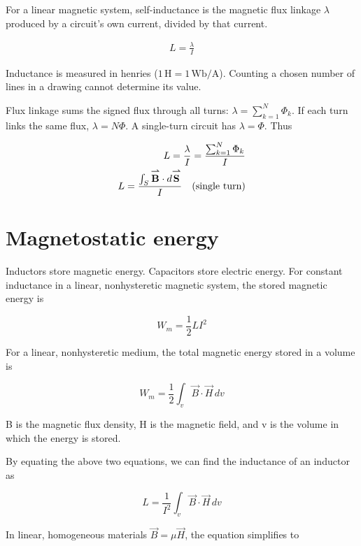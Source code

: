 \documentclass{ximera}
\begin{document}
For a linear magnetic system, self-inductance is the magnetic flux linkage $\lambda$ produced by a circuit's own current, divided by that current.
 
 \begin{eqnarray}
 L=\frac{\lambda}{I}
 \end{eqnarray}
 
Inductance is measured in henries ($1\,\mathrm{H}=1\,\mathrm{Wb}/\mathrm{A}$). Counting a chosen number of lines in a drawing cannot determine its value.

Flux linkage sums the signed flux through all turns: $\lambda=\sum_{k=1}^{N}\Phi_k$. If each turn links the same flux, $\lambda=N\Phi$. A single-turn circuit has $\lambda=\Phi$. Thus

\begin{eqnarray}
L=\frac{\lambda}{I}=\frac{\sum_{k=1}^{N}\Phi_k}{I} \\
L=\frac{\int_S\vec{B}\cdot d\vec{S}}{I}\quad\hbox{(single turn)}
\end{eqnarray}

\section{Magnetostatic energy}

Inductors store magnetic energy. Capacitors store electric energy. For constant inductance in a linear, nonhysteretic magnetic system, the stored magnetic energy is

\begin{equation}
W_m=\frac{1}{2} L I^2
\end{equation}

For a linear, nonhysteretic medium, the total magnetic energy stored in a volume is

\begin{equation}
W_m=\frac{1}{2}\int_v \vec{B} \cdot \vec{H} \, dv 
\end{equation}

B is the magnetic flux density, H is the magnetic field, and v is the volume in which the energy is stored. 

By equating the above two equations, we can find the inductance of an inductor as

\begin{equation}
L=\frac{1}{I^2} \int_v \vec{B} \cdot \vec{H} \,dv 
\end{equation}

In linear, homogeneous materials $\vec{B} = \mu \vec{H}$, the equation simplifies to
\end{document}
